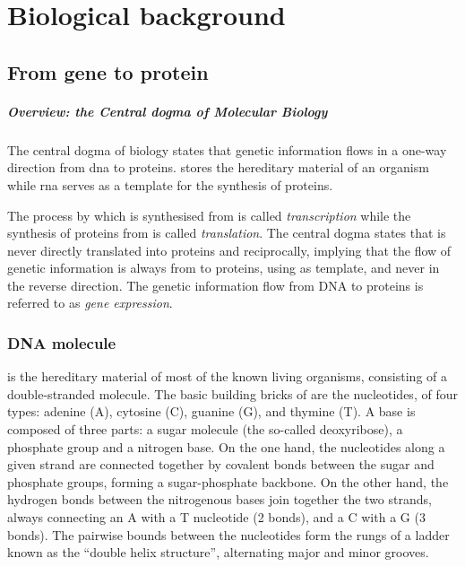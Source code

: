 \chapter{Biological background}

\section{From gene to protein}

\paragraph{Overview: the Central dogma of Molecular Biology}
The central dogma of biology states that genetic information flows in a one-way direction from \gls{dna} to proteins.  stores the hereditary material of an organism while \gls{rna} serves as a template for the synthesis of proteins. 

The process by which  is synthesised from  is called \textit{transcription} while the synthesis of proteins from  is called \textit{translation}. The central dogma states that  is never directly translated into proteins and reciprocally, implying that the flow of genetic information is always from  to proteins, using  as template, and never in the reverse direction. The genetic information flow from DNA to proteins is referred to as \textit{gene expression}.


\subsection{DNA molecule}
\label{subsec:DNA}
 is the hereditary material of most of the known living organisms, consisting of a double-stranded molecule. The basic building bricks of  are the nucleotides, of four types: adenine (A), cytosine (C), guanine (G), and thymine (T). A base is composed of three parts: a sugar molecule (the so-called deoxyribose), a phosphate group and a nitrogen base. On the one hand, the nucleotides along a given strand are connected together by covalent bonds between the sugar and phosphate groups, forming a sugar-phosphate \gls{backbone}. On the other hand, the hydrogen bonds between the nitrogenous bases join together the two strands, always connecting an A with a T nucleotide (2 bonds), and a C with a G (3 bonds). The pairwise bounds between the nucleotides form the rungs of a ladder known as the \enquote{double helix structure}, alternating major and minor grooves. 



